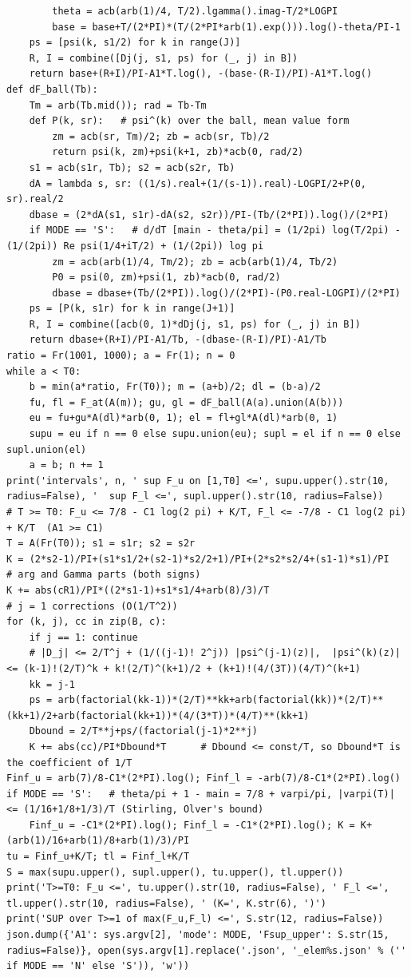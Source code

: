 \documentclass[11pt,reqno]{amsart}
\numberwithin{equation}{section}
\theoremstyle{definition}
\theoremstyle{remark}
\begin{document}
\begin{lstlisting}
        theta = acb(arb(1)/4, T/2).lgamma().imag-T/2*LOGPI
        base = base+T/(2*PI)*(T/(2*PI*arb(1).exp())).log()-theta/PI-1
    ps = [psi(k, s1/2) for k in range(J)]
    R, I = combine([Dj(j, s1, ps) for (_, j) in B])
    return base+(R+I)/PI-A1*T.log(), -(base-(R-I)/PI)-A1*T.log()
def dF_ball(Tb):
    Tm = arb(Tb.mid()); rad = Tb-Tm
    def P(k, sr):   # psi^(k) over the ball, mean value form
        zm = acb(sr, Tm)/2; zb = acb(sr, Tb)/2
        return psi(k, zm)+psi(k+1, zb)*acb(0, rad/2)
    s1 = acb(s1r, Tb); s2 = acb(s2r, Tb)
    dA = lambda s, sr: ((1/s).real+(1/(s-1)).real)-LOGPI/2+P(0, sr).real/2
    dbase = (2*dA(s1, s1r)-dA(s2, s2r))/PI-(Tb/(2*PI)).log()/(2*PI)
    if MODE == 'S':   # d/dT [main - theta/pi] = (1/2pi) log(T/2pi) - (1/(2pi)) Re psi(1/4+iT/2) + (1/(2pi)) log pi
        zm = acb(arb(1)/4, Tm/2); zb = acb(arb(1)/4, Tb/2)
        P0 = psi(0, zm)+psi(1, zb)*acb(0, rad/2)
        dbase = dbase+(Tb/(2*PI)).log()/(2*PI)-(P0.real-LOGPI)/(2*PI)
    ps = [P(k, s1r) for k in range(J+1)]
    R, I = combine([acb(0, 1)*dDj(j, s1, ps) for (_, j) in B])
    return dbase+(R+I)/PI-A1/Tb, -(dbase-(R-I)/PI)-A1/Tb
ratio = Fr(1001, 1000); a = Fr(1); n = 0
while a < T0:
    b = min(a*ratio, Fr(T0)); m = (a+b)/2; dl = (b-a)/2
    fu, fl = F_at(A(m)); gu, gl = dF_ball(A(a).union(A(b)))
    eu = fu+gu*A(dl)*arb(0, 1); el = fl+gl*A(dl)*arb(0, 1)
    supu = eu if n == 0 else supu.union(eu); supl = el if n == 0 else supl.union(el)
    a = b; n += 1
print('intervals', n, ' sup F_u on [1,T0] <=', supu.upper().str(10, radius=False), '  sup F_l <=', supl.upper().str(10, radius=False))
# T >= T0: F_u <= 7/8 - C1 log(2 pi) + K/T, F_l <= -7/8 - C1 log(2 pi) + K/T  (A1 >= C1)
T = A(Fr(T0)); s1 = s1r; s2 = s2r
K = (2*s2-1)/PI+(s1*s1/2+(s2-1)*s2/2+1)/PI+(2*s2*s2/4+(s1-1)*s1)/PI      # arg and Gamma parts (both signs)
K += abs(cR1)/PI*((2*s1-1)+s1*s1/4+arb(8)/3)/T                           # j = 1 corrections (O(1/T^2))
for (k, j), cc in zip(B, c):
    if j == 1: continue
    # |D_j| <= 2/T^j + (1/((j-1)! 2^j)) |psi^(j-1)(z)|,  |psi^(k)(z)| <= (k-1)!(2/T)^k + k!(2/T)^(k+1)/2 + (k+1)!(4/(3T))(4/T)^(k+1)
    kk = j-1
    ps = arb(factorial(kk-1))*(2/T)**kk+arb(factorial(kk))*(2/T)**(kk+1)/2+arb(factorial(kk+1))*(4/(3*T))*(4/T)**(kk+1)
    Dbound = 2/T**j+ps/(factorial(j-1)*2**j)
    K += abs(cc)/PI*Dbound*T      # Dbound <= const/T, so Dbound*T is the coefficient of 1/T
Finf_u = arb(7)/8-C1*(2*PI).log(); Finf_l = -arb(7)/8-C1*(2*PI).log()
if MODE == 'S':   # theta/pi + 1 - main = 7/8 + varpi/pi, |varpi(T)| <= (1/16+1/8+1/3)/T (Stirling, Olver's bound)
    Finf_u = -C1*(2*PI).log(); Finf_l = -C1*(2*PI).log(); K = K+(arb(1)/16+arb(1)/8+arb(1)/3)/PI
tu = Finf_u+K/T; tl = Finf_l+K/T
S = max(supu.upper(), supl.upper(), tu.upper(), tl.upper())
print('T>=T0: F_u <=', tu.upper().str(10, radius=False), ' F_l <=', tl.upper().str(10, radius=False), ' (K=', K.str(6), ')')
print('SUP over T>=1 of max(F_u,F_l) <=', S.str(12, radius=False))
json.dump({'A1': sys.argv[2], 'mode': MODE, 'Fsup_upper': S.str(15, radius=False)}, open(sys.argv[1].replace('.json', '_elem%s.json' % ('' if MODE == 'N' else 'S')), 'w'))
\end{lstlisting}
\end{document}
